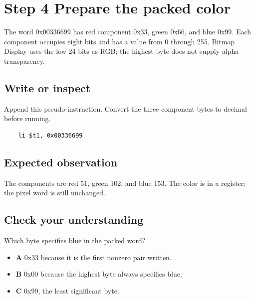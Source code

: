 \section{Step 4 Prepare the packed
  color}\label{002-single-pixel-s04-step-4-prepare-the-packed-color}

The word 0x00336699 has red component 0x33, green 0x66, and blue 0x99.
Each component occupies eight bits and has a value from 0 through 255.
Bitmap Display uses the low 24 bits as RGB; the highest byte does not
supply alpha transparency.

\subsection{Write or
  inspect}\label{002-single-pixel-s04-write-or-inspect}

Append this pseudo-instruction. Convert the three component bytes to
decimal before running.

\begin{verbatim}
    li $t1, 0x00336699
\end{verbatim}

\subsection{Expected
  observation}\label{002-single-pixel-s04-expected-observation}

The components are red 51, green 102, and blue 153. The color is in a
register; the pixel word is still unchanged.

\subsection{Check your
  understanding}\label{002-single-pixel-s04-check-your-understanding}

Which byte specifies blue in the packed word?

\begin{itemize}
  \tightlist
  \item
        \textbf{A} 0x33 because it is the first nonzero pair written.
  \item
        \textbf{B} 0x00 because the highest byte always specifies blue.
  \item
        \textbf{C} 0x99, the least significant byte.
\end{itemize}
